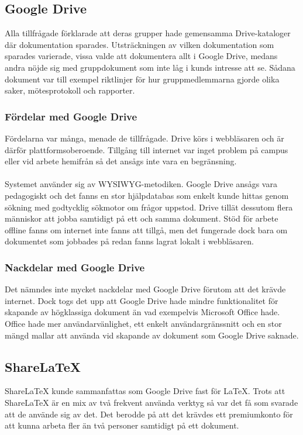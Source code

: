 \subsection{Google Drive}
\label{sec:wassing-googledrive}
Alla tillfrågade förklarade att deras grupper hade gemensamma Drive-kataloger där dokumentation sparades. Utsträckningen av vilken dokumentation som sparades varierade, vissa valde att dokumentera allt i Google Drive, medans andra nöjde sig med gruppdokument som inte låg i kunds intresse att se. Sådana dokument var till exempel riktlinjer för hur gruppmedlemmarna gjorde olika saker, mötesprotokoll och rapporter.

\subsubsection{Fördelar med Google Drive}
\label{subsec:wassing-googledrive-pros}
Fördelarna var många, menade de tillfrågade. Drive körs i webbläsaren och är därför plattformsoberoende. Tillgång till internet var inget problem på campus eller vid arbete hemifrån så det ansågs inte vara en begränsning.
\\ \\
Systemet använder sig av WYSIWYG-metodiken. Google Drive ansågs vara pedagogiskt och det fanns en stor hjälpdatabas som enkelt kunde hittas genom sökning med godtycklig sökmotor om frågor uppstod. Drive tillät dessutom flera människor att jobba samtidigt på ett och samma dokument. Stöd för arbete offline fanns om internet inte fanns att tillgå, men det fungerade dock bara om dokumentet som jobbades på redan fanns lagrat lokalt i webbläsaren.

\subsubsection{Nackdelar med Google Drive}
Det nämndes inte mycket nackdelar med Google Drive förutom att det krävde internet. Dock togs det upp att Google Drive hade mindre funktionalitet för skapande av högklassiga dokument än vad exempelvis Microsoft Office hade. Office hade mer användarvänlighet, ett enkelt användargränssnitt och en stor mängd mallar att använda vid skapande av dokument som Google Drive saknade.

\subsection{ShareLaTeX}
\label{sec:wassing-sharelatex}
ShareLaTeX kunde sammanfattas som Google Drive fast för LaTeX. Trots att ShareLaTeX är en mix av två frekvent använda verktyg så var det få som svarade att de använde sig av det. Det berodde på att det krävdes ett premiumkonto för att kunna arbeta fler än två personer samtidigt på ett dokument. %

